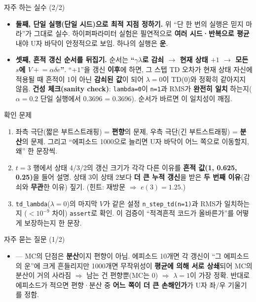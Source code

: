 \documentclass[aspectratio=169,11pt]{beamer}
\begin{document}
\begin{frame}{자주 하는 실수 (2/2)}
  \begin{itemize}
    \item \textbf{둘째, 단일 실행(단일 시드)으로 최적 지점 정하기.}
      위 ``단 한 번의 실행은 믿지 마라''가 그대로 실수. 하이퍼파라미터
      실험은 필연적으로 \textbf{여러 시드·반복으로 평균}내야 U자 바닥이
      안정적으로 보임. 하나의 실행은 \textbf{운}.
    \item \textbf{셋째, 흔적 갱신 순서를 뒤집기.} 순서는
      \textbf{``$\gamma\lambda$로 감쇠 $\to$ 현재 상태 $+1$ $\to$
      모든 $s$에 $V \mathrel{+}= \alpha\delta e$''}.
      ``$+1$''을 갱신 \textbf{이후}에 하면, 그 스텝 TD 오차가 현재
      상태 자신에 적용될 때 흔적이 1이 아닌 \textbf{감쇠된 값}이 되어
      $\lambda=0$이 TD(0)와 정확히 같아지지 않음.
      \textbf{건성 체크(sanity check)}:
      \texttt{lambda=0}이 \texttt{n=1}과 RMS가 \textbf{완전히 일치}
      하는지($\alpha=0.2$ 단일 실행에서 0.3696 = 0.3696).
      순서가 바르면 이 일치성이 깨짐.
  \end{itemize}
\end{frame}

\begin{frame}{확인 문제}
  \begin{enumerate}
    \item {} 좌측 극단(짧은 부트스트래핑) = \textbf{
      편향}의 문제, 우측 극단(긴 부트스트래핑) = \textbf{분산}의
      문제. 그리고 ``에피소드 1000으로 늘리면 U자 바닥이 어느
      쪽으로 이동할지, 왜'' 한 문장씩.
    \item {} $t=3$ 행에서 상태 4/3/2의 갱신 크기가
      각각 다른 이유를 \textbf{흔적 값(1, 0.625, 0.25)}을 들어 설명.
      상태 3이 상태 2보다 \textbf{더 큰 누적 갱신}을 받은
      \textbf{두 번째 이유}(감쇠와 \textbf{무관}한 이유) 짚기.
      (힌트: 재방문 $\Rightarrow$ $e(3)=1.25$.)
    \item {} \texttt{td\_lambda}($\lambda=0$)의 마지막 $V$가
      같은 설정 \texttt{n\_step\_td(n=1)}과 RMS가 일치하는지
      ($<10^{-9}$ 차이) \texttt{assert}로 확인. 이 검증이
      ``적격흔적 코드가 올바른가''를 어떻게 보장하는지 한 문장.
  \end{enumerate}
\end{frame}

\begin{frame}{자주 묻는 질문 (1/2)}
  \begin{itemize}
    \item {}
      --- MC의 단점은 \textbf{분산}이지 편향이 아님. 에피소드 10개면
      각 갱신이 ``그 에피소드의 운''에 크게 흔들리지만 1000개면
      무작위성이 \textbf{평균에 의해 서로 상쇄}되어 MC의 분산이 거의
      사라짐 $\Rightarrow$ 남는 건 편향뿐(MC는 0) $\Rightarrow$
      $\lambda=1$이 가장 정확. 반대로 에피소드가 적으면 편향·분산
      중 \textbf{어느 쪽이 더 큰 손해인가}가 U자 좌/우 기울기를
      정함.
  \end{itemize}
\end{frame}
\end{document}

